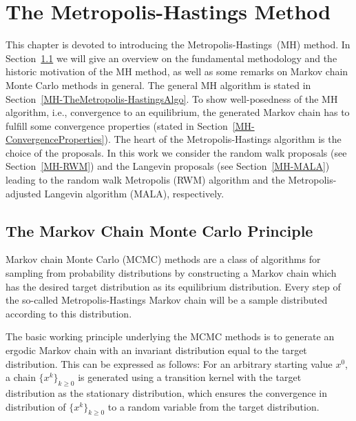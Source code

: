 \chapter{The Metropolis-Hastings Method}
\label{sec:Metropolis-HastingsMethod}


This chapter is devoted to introducing the Metropolis-Hastings~(MH) method. In Section~\ref{MH-MCMCPrinciple} we will give an overview on the fundamental methodology and the historic motivation of the MH method, as well as some remarks on Markov chain Monte Carlo methods in general. The general MH algorithm is stated in Section~\ref{MH-TheMetropolis-HastingsAlgo}. To show well-posedness of the MH algorithm, i.e., convergence to an equilibrium, the generated Markov chain has to fulfill some convergence properties (stated in Section~\ref{MH-ConvergenceProperties}). The heart of the Metropolis-Hastings algorithm is the choice of the proposals. In this work we consider the random walk proposals (see Section~\ref{MH-RWM}) and the Langevin proposals (see Section~\ref{MH-MALA}) leading to the random walk Metropolis (RWM) algorithm and the Metropolis-adjusted Langevin algorithm (MALA), respectively.


\section{The Markov Chain Monte Carlo Principle}
\label{MH-MCMCPrinciple}

Markov chain Monte Carlo (MCMC) methods are a class of algorithms for sampling from probability distributions by constructing a Markov chain which has the desired target distribution as its equilibrium distribution. Every step of the so-called Metropolis-Hastings Markov chain will be a sample distributed according to this distribution.

The basic working principle underlying the MCMC methods is to generate an ergodic Markov chain with an invariant distribution equal to the target distribution. This can be expressed as follows: For an arbitrary starting value $x^0$, a chain $ \{ x^{k} \}_{k \geq 0} $ is generated using a transition kernel with the target distribution as the stationary distribution, which ensures the convergence in distribution of $ \{ x^{k} \}_{k \geq 0} $ to a random variable from the target distribution.


